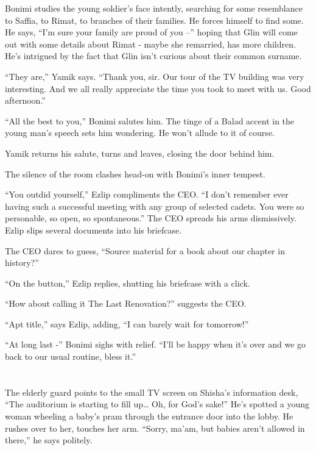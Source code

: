 \documentclass[twoside,11pt]{book}
\begin{document}
Bonimi studies the young soldier's face intently, searching for some resemblance to Saffia, to Rimat, to branches of
their families. He forces himself to find some. He says, ``I'm sure your family are proud
of you --'' hoping that Glin will come out with some details about Rimat - maybe she remarried, has more
children. He's intrigued by the fact that Glin isn't curious about their common surname.

``They are,'' Yamik says. ``Thank you, sir. Our tour of the TV building was very
interesting. And we all really appreciate the time you took to meet with us. Good afternoon.''

``All the best to you,'' Bonimi salutes him. The tinge of a Balad accent in the young man's
speech sets him wondering. He won't allude to it of course.

Yamik returns his salute, turns and leaves, closing the door behind him.

The silence of the room clashes head-on with Bonimi's inner tempest.

``You outdid yourself,'' Ezlip compliments the CEO. ``I don't remember ever
having such a successful meeting with any group of selected cadets. You were so personable, so open, so
spontaneous.'' The CEO spreads his arms dismissively. Ezlip slips several documents into his
briefcase.

The CEO dares to guess, ``Source material for a book about our chapter in history?''

``On the button,'' Ezlip replies, shutting his briefcase with a click.

``How about calling it The Last Renovation?'' suggests the CEO.

``Apt title,'' says Ezlip, adding, ``I can barely wait for
tomorrow!''

``At long last -'' Bonimi sighs with relief. ``I'll be happy when it's over and
we go back to our usual routine, bless it.''


\bigskip

\chapter{}

The  elderly guard points to the small TV screen on Shisha's information desk, ``The auditorium is starting
to fill up{\dots} Oh, for God's sake!'' He's spotted a young woman wheeling a baby's pram through the
entrance door into the lobby. He rushes over to her, touches her arm.
``Sorry, ma'am, but babies aren't allowed in there,'' he says politely.
\end{document}
